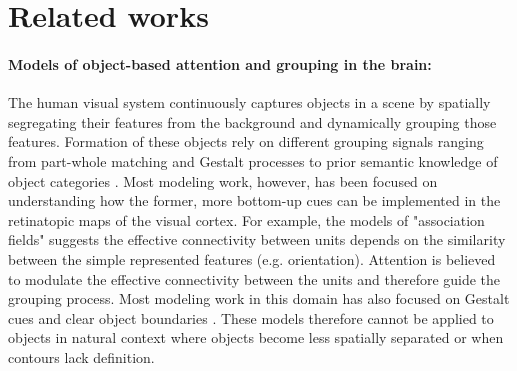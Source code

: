 \documentclass{article}
\begin{document}
\section{Related works}

\paragraph{Models of object-based attention and grouping in the brain:} The human visual system continuously captures objects in a scene by spatially segregating their features from the background and dynamically grouping those features. Formation of these objects rely on different grouping signals ranging from part-whole matching and Gestalt processes to prior semantic knowledge of object categories \citep{greff2020binding, vecera2000toward, wagemans2012century, gilbert_top-down_2013}. Most modeling work, however, has been focused on understanding how the former, more bottom-up cues can be implemented in the retinatopic maps of the visual cortex. For example, the models of "association fields" \citep{field1993contour} suggests the effective connectivity between units depends on the similarity between the simple represented features (e.g. orientation). Attention is believed to modulate the effective connectivity between the units and therefore guide the grouping process. Most modeling work in this domain has also focused on  Gestalt cues and clear object boundaries \citep{jeurissen2016serial}. These models therefore cannot be applied to objects in natural context where objects become less spatially separated or when contours lack definition.





\end{document}
